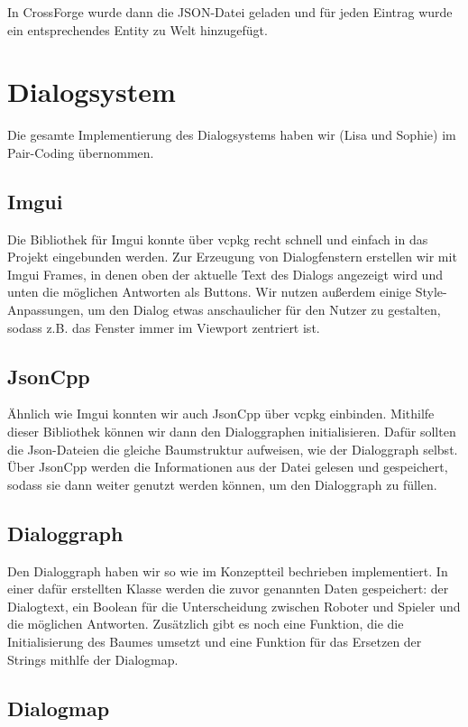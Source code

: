 In CrossForge wurde dann die JSON-Datei geladen und für jeden Eintrag wurde ein entsprechendes Entity zu Welt hinzugefügt.

\section{Dialogsystem}

Die gesamte Implementierung des Dialogsystems haben wir (Lisa und Sophie) im Pair-Coding übernommen. 

\subsection{Imgui}

Die Bibliothek für Imgui konnte über vcpkg recht schnell und einfach in das Projekt eingebunden werden. Zur Erzeugung von Dialogfenstern erstellen wir mit Imgui Frames, in denen oben der aktuelle Text des Dialogs angezeigt wird und unten die möglichen Antworten als Buttons. Wir nutzen außerdem einige Style-Anpassungen, um den Dialog etwas anschaulicher für den Nutzer zu gestalten, sodass z.B. das Fenster immer im Viewport zentriert ist.

\subsection{JsonCpp}

Ähnlich wie Imgui konnten wir auch JsonCpp über vcpkg einbinden. Mithilfe dieser Bibliothek können wir dann den Dialoggraphen initialisieren. Dafür sollten die Json-Dateien die gleiche Baumstruktur aufweisen, wie der Dialoggraph selbst. Über JsonCpp werden die Informationen aus der Datei gelesen und gespeichert, sodass sie dann weiter genutzt werden können, um den Dialoggraph zu füllen.

\subsection{Dialoggraph}

Den Dialoggraph haben wir so wie im Konzeptteil bechrieben implementiert. In einer dafür erstellten Klasse werden die zuvor genannten Daten gespeichert: der Dialogtext, ein Boolean für die Unterscheidung zwischen Roboter und Spieler und die möglichen Antworten. Zusätzlich gibt es noch eine Funktion, die die Initialisierung des Baumes umsetzt und eine Funktion für das Ersetzen der Strings mithlfe der Dialogmap.

\subsection{Dialogmap}

